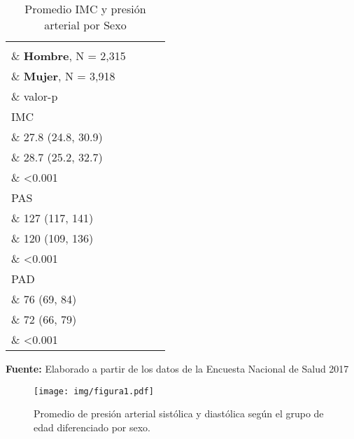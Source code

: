 \documentclass{aa}
\begin{document}
\begin{table}
\caption{\small Promedio IMC y presión arterial por Sexo}
    \hspace{-4mm}
    \centering
    \tiny
\begin{tabular}{lccc}
\toprule
\textbf{ } \\\& \textbf{Hombre}, N = 2,315 \\\& \textbf{Mujer}, N = 3,918 \\\& valor-p \\ 
\midrule
IMC \\\& 27.8 (24.8, 30.9) \\\& 28.7 (25.2, 32.7) \\\& <0.001 \\ 
PAS \\\& 127 (117, 141) \\\& 120 (109, 136) \\\& <0.001 \\ 
PAD \\\& 76 (69, 84) \\\& 72 (66, 79) \\\& <0.001 \\ 
 \bottomrule
\end{tabular}
    \vspace{1ex}
    
    {\raggedright \small \textbf{Fuente:} Elaborado a partir de los datos de la Encuesta Nacional de Salud 2017 \par}
\end{table}

\begin{figure}
\centering
  \texttt{[image: img/figura1.pdf]}
  \caption{Promedio de presión arterial sistólica y diastólica según el grupo de edad diferenciado por sexo.}
\end{figure}
\end{document}
